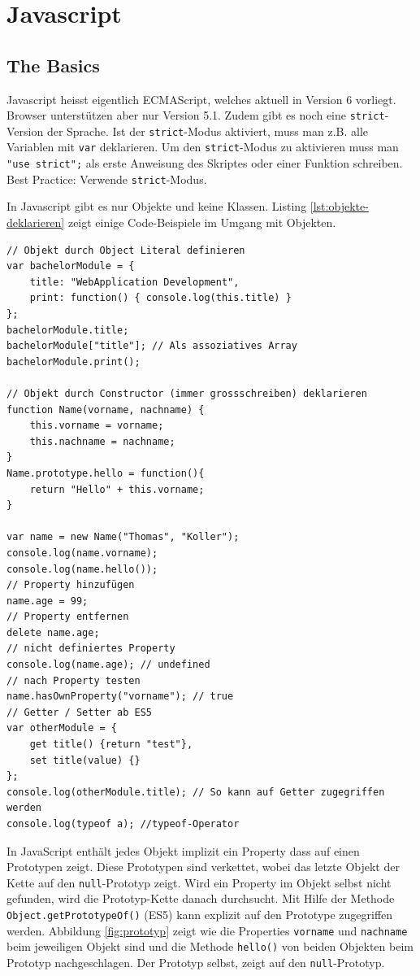 \chapter{Javascript}

\section{The Basics}

Javascript heisst eigentlich ECMAScript, welches aktuell in Version 6 vorliegt. Browser unterstützen aber nur Version 5.1. Zudem gibt es noch eine \lstinline|strict|-Version der Sprache. Ist der \lstinline|strict|-Modus aktiviert, muss man z.B. alle Variablen mit \lstinline|var| deklarieren. Um den \lstinline|strict|-Modus zu aktivieren muss man \lstinline|"use strict";| als erste Anweisung des Skriptes oder einer Funktion schreiben. Best Practice: Verwende  \lstinline|strict|-Modus. 

In Javascript gibt es nur Objekte und keine Klassen. Listing \ref{lst:objekte-deklarieren} zeigt einige Code-Beispiele im Umgang mit Objekten.

\begin{lstlisting}[label=lst:objekte-deklarieren,caption=Objekte deklarieren]
// Objekt durch Object Literal definieren
var bachelorModule = {
	title: "WebApplication Development",
	print: function() { console.log(this.title) }
};
bachelorModule.title;
bachelorModule["title"]; // Als assoziatives Array
bachelorModule.print();

// Objekt durch Constructor (immer grossschreiben) deklarieren
function Name(vorname, nachname) {
	this.vorname = vorname;
	this.nachname = nachname;
}
Name.prototype.hello = function(){
	return "Hello" + this.vorname;
}

var name = new Name("Thomas", "Koller");
console.log(name.vorname);
console.log(name.hello());
// Property hinzufügen
name.age = 99;
// Property entfernen
delete name.age;
// nicht definiertes Property
console.log(name.age); // undefined
// nach Property testen
name.hasOwnProperty("vorname"); // true
// Getter / Setter ab ES5
var otherModule = {
	get title() {return "test"},
	set title(value) {}
};
console.log(otherModule.title); // So kann auf Getter zugegriffen werden
console.log(typeof a); //typeof-Operator
\end{lstlisting}

In JavaScript enthält jedes Objekt implizit ein Property dass auf einen Prototypen zeigt. Diese Prototypen sind verkettet, wobei das letzte Objekt der Kette auf den \lstinline|null|-Prototyp zeigt. Wird ein Property im Objekt selbst nicht gefunden, wird die Prototyp-Kette danach durchsucht. Mit Hilfe der Methode \lstinline|Object.getPrototypeOf()| (ES5) kann explizit auf den Prototype zugegriffen werden. Abbildung \ref{fig:prototyp} zeigt wie die Properties \lstinline|vorname| und \lstinline|nachname| beim jeweiligen Objekt sind und die Methode \lstinline|hello()| von beiden Objekten beim Prototyp nachgeschlagen. Der Prototyp selbst, zeigt auf den \lstinline|null|-Prototyp.

